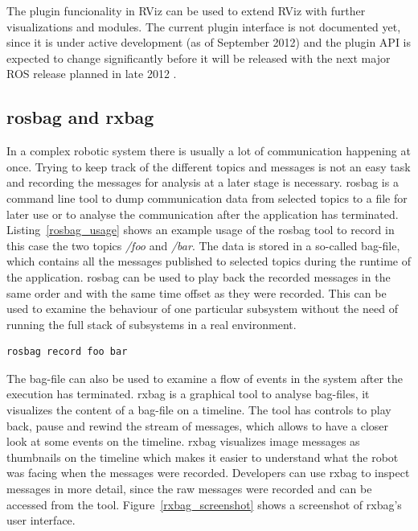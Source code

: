 The plugin funcionality in RViz can be used to extend RViz with further visualizations and modules. The current plugin interface is not documented yet, since it is under active development (as of September 2012) and the plugin API is expected to change significantly before it will be released with the next major ROS release planned in late 2012 \cite{rvizPlugin}.

\subsection{rosbag and rxbag}
In a complex robotic system there is usually a lot of communication happening at once. Trying to keep track of the different topics and messages is not an easy task and recording the messages for analysis at a later stage is necessary. rosbag is a command line tool to dump communication data from selected topics to a file for later use or to analyse the communication after the application has terminated. Listing~\ref{rosbag_usage} shows an example usage of the rosbag tool to record in this case the two topics \emph{/foo} and \emph{/bar}. The data is stored in a so-called bag-file, which contains all the messages published to selected topics during the runtime of the application. rosbag can be used to play back the recorded messages in the same order and with the same time offset as they were recorded. This can be used to examine the behaviour of one particular subsystem without the need of running the full stack of subsystems in a real environment.

\begin{lstlisting}[frame=single,caption={Example usage of rosbag.},label=rosbag_usage]
rosbag record foo bar
\end{lstlisting}

The bag-file can also be used to examine a flow of events in the system after the execution has terminated. rxbag is a graphical tool to analyse bag-files, it visualizes the content of a bag-file on a timeline. The tool has controls to play back, pause and rewind the stream of messages, which allows to have a closer look at some events on the timeline. rxbag visualizes image messages as thumbnails on the timeline which makes it easier to understand what the robot was facing when the messages were recorded. Developers can use rxbag to inspect messages in more detail, since the raw messages were recorded and can be accessed from the tool. Figure~\ref{rxbag_screenshot} shows a screenshot of rxbag's user interface.

